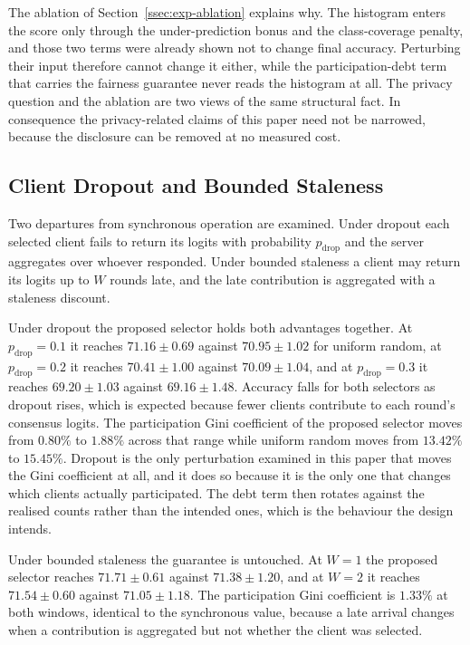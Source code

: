 \documentclass[journal]{IEEEtran}
\newcommand{\rev}[1]{#1}
\begin{document}
\rev{The ablation of Section~\ref{ssec:exp-ablation} explains why. The histogram enters the score only through the under-prediction bonus and the class-coverage penalty, and those two terms were already shown not to change final accuracy. Perturbing their input therefore cannot change it either, while the participation-debt term that carries the fairness guarantee never reads the histogram at all. The privacy question and the ablation are two views of the same structural fact. In consequence the privacy-related claims of this paper need not be narrowed, because the disclosure can be removed at no measured cost.}

\subsection{Client Dropout and Bounded Staleness}
\label{ssec:exp-dropout}

\rev{Two departures from synchronous operation are examined. Under dropout each selected client fails to return its logits with probability $p_{\text{drop}}$ and the server aggregates over whoever responded. Under bounded staleness a client may return its logits up to $W$ rounds late, and the late contribution is aggregated with a staleness discount.}

\rev{Under dropout the proposed selector holds both advantages together. At $p_{\text{drop}} = 0.1$ it reaches $71.16 \pm 0.69$ against $70.95 \pm 1.02$ for uniform random, at $p_{\text{drop}} = 0.2$ it reaches $70.41 \pm 1.00$ against $70.09 \pm 1.04$, and at $p_{\text{drop}} = 0.3$ it reaches $69.20 \pm 1.03$ against $69.16 \pm 1.48$. Accuracy falls for both selectors as dropout rises, which is expected because fewer clients contribute to each round's consensus logits. The participation Gini coefficient of the proposed selector moves from $0.80\%$ to $1.88\%$ across that range while uniform random moves from $13.42\%$ to $15.45\%$. Dropout is the only perturbation examined in this paper that moves the Gini coefficient at all, and it does so because it is the only one that changes which clients actually participated. The debt term then rotates against the realised counts rather than the intended ones, which is the behaviour the design intends.}

\rev{Under bounded staleness the guarantee is untouched. At $W = 1$ the proposed selector reaches $71.71 \pm 0.61$ against $71.38 \pm 1.20$, and at $W = 2$ it reaches $71.54 \pm 0.60$ against $71.05 \pm 1.18$. The participation Gini coefficient is $1.33\%$ at both windows, identical to the synchronous value, because a late arrival changes when a contribution is aggregated but not whether the client was selected.}
\end{document}
